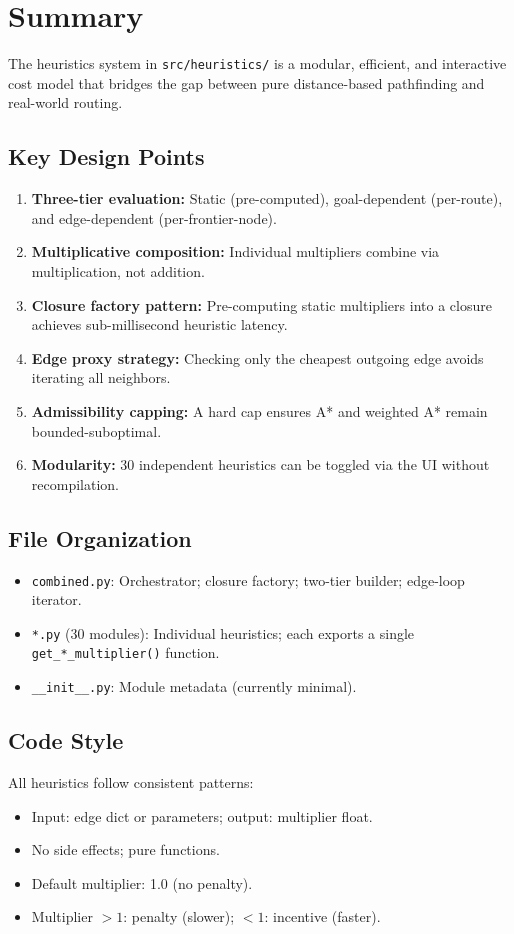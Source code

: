 \documentclass[12pt,a4paper]{article}
\begin{document}
\newpage

\section{Summary}

The heuristics system in \texttt{src/heuristics/} is a modular, efficient, and interactive cost model that bridges the gap between pure distance-based pathfinding and real-world routing.

\subsection{Key Design Points}

\begin{enumerate}
  \item \textbf{Three-tier evaluation:} Static (pre-computed), goal-dependent (per-route), and edge-dependent (per-frontier-node).
  \item \textbf{Multiplicative composition:} Individual multipliers combine via multiplication, not addition.
  \item \textbf{Closure factory pattern:} Pre-computing static multipliers into a closure achieves sub-millisecond heuristic latency.
  \item \textbf{Edge proxy strategy:} Checking only the cheapest outgoing edge avoids iterating all neighbors.
  \item \textbf{Admissibility capping:} A hard cap ensures A* and weighted A* remain bounded-suboptimal.
  \item \textbf{Modularity:} 30 independent heuristics can be toggled via the UI without recompilation.
\end{enumerate}

\subsection{File Organization}

\begin{itemize}
  \item \texttt{combined.py}: Orchestrator; closure factory; two-tier builder; edge-loop iterator.
  \item \texttt{*.py} (30 modules): Individual heuristics; each exports a single \texttt{get\_*\_multiplier()} function.
  \item \texttt{\_\_init\_\_.py}: Module metadata (currently minimal).
\end{itemize}

\subsection{Code Style}

All heuristics follow consistent patterns:
\begin{itemize}
  \item Input: edge dict or parameters; output: multiplier float.
  \item No side effects; pure functions.
  \item Default multiplier: 1.0 (no penalty).
  \item Multiplier $> 1$: penalty (slower); $< 1$: incentive (faster).
\end{itemize}
\end{document}

